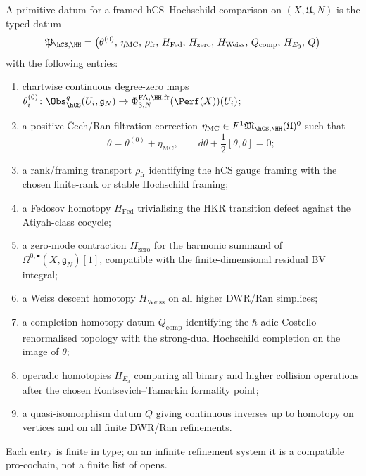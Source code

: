 \begin{definition}
\label{def:hcs-hochschild-primitive-package}
A primitive datum for a framed hCS--Hochschild comparison on
$(X,\mathfrak U,N)$ is the typed datum
\[
 \mathfrak P_{\hCS,\HH}
 =
 \bigl(
 \theta^{(0)},\,
 \eta_{\mathrm{MC}},\,
 \rho_{\mathrm{fr}},\,
 H_{\mathrm{Fed}},\,
 H_{\mathrm{zero}},\,
 H_{\mathrm{Weiss}},\,
 Q_{\mathrm{comp}},\,
 H_{E_3},\,
 Q
 \bigr)
\]
with the following entries:
\begin{enumerate}
\item chartwise continuous degree-zero maps
$\theta_i^{(0)}\colon
\Obs_{\hCS}^{q}(U_i,\mathfrak g_N)\to
\Phi^{\mathrm{FA},\HH,\mathrm{fr}}_{3,N}(\Perf(X))(U_i)$;
\item a positive \v{C}ech/Ran filtration correction
$\eta_{\mathrm{MC}}\in F^1\mathfrak M_{\hCS,\HH}(\mathfrak U)^0$
such that
\[
 \theta=\theta^{(0)}+\eta_{\mathrm{MC}},
 \qquad
 d\theta+\frac12[\theta,\theta]=0;
\]
\item a rank/framing transport $\rho_{\mathrm{fr}}$ identifying the
hCS gauge framing with the chosen finite-rank or stable
Hochschild framing;
\item a Fedosov homotopy $H_{\mathrm{Fed}}$ trivialising the
HKR transition defect against the Atiyah-class cocycle;
\item a zero-mode contraction $H_{\mathrm{zero}}$ for the harmonic
summand of $\Omega^{0,\bullet}(X,\mathfrak g_N)[1]$, compatible with
the finite-dimensional residual BV integral;
\item a Weiss descent homotopy $H_{\mathrm{Weiss}}$ on all higher
DWR/Ran simplices;
\item a completion homotopy datum $Q_{\mathrm{comp}}$ identifying the
$\hbar$-adic Costello-renormalised topology with the strong-dual
Hochschild completion on the image of $\theta$;
\item operadic homotopies $H_{E_3}$ comparing all binary and higher
collision operations after the chosen Kontsevich--Tamarkin formality
point;
\item a quasi-isomorphism datum $Q$ giving continuous inverses up
to homotopy on vertices and on all finite DWR/Ran refinements.
\end{enumerate}
Each entry is finite in type; on an infinite refinement system it is a
compatible pro-cochain, not a finite list of opens.
\end{definition}

